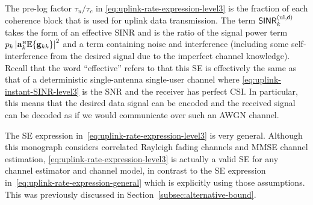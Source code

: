 The pre-log factor ${\tau_u}/{\tau_c}$ in \eqref{eq:uplink-rate-expression-level3} is the fraction of each coherence block that is used for uplink data transmission. The term $\mathsf{SINR}_{k}^{({\rm ul},\mathsf{d})}$ takes the form of an effective SINR and is the ratio of the signal power term $p_{k} \left| \vect{a}_{k}^{\Htran} \mathbb{E}\{ \vect{g}_{kk}\} \right|^2 $ and a term containing noise and interference (including some self-interference from the desired signal due to the imperfect channel knowledge).
Recall that the word ``effective'' refers to that this SE is effectively the same as that of a deterministic single-antenna single-user channel where \eqref{eq:uplink-instant-SINR-level3} is the SNR and the receiver has perfect CSI. In particular, this means that the desired data signal can be encoded and the received signal can be decoded as if we would communicate over such an AWGN channel.

The SE expression in~\eqref{eq:uplink-rate-expression-level3} is very general. 
Although this monograph considers correlated Rayleigh fading channels and MMSE channel estimation, \eqref{eq:uplink-rate-expression-level3} is actually a valid SE for any channel estimator and channel model, 
in contrast to the SE expression in~\eqref{eq:uplink-rate-expression-general} which is explicitly using those assumptions. This was previously discussed in Section~\ref{subsec:alternative-bound}.

